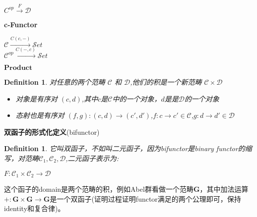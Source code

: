 \documentclass{article}
\newtheorem{definition}[theorem]{Definition}
\begin{document}
\begin{center}
$C^{op} \xrightarrow{F} \mathcal{D}$ \\
\end{center}

\begin{flushleft}
\textbf{c-Functor} \\
\begin{center}
$\mathcal{C} \xrightarrow{C(c,-)} \mathcal{S}et$ \\
$\mathcal{C}^{op} \xrightarrow{C(-,c)} \mathcal{S}et$ \\
\end{center}
\end{flushleft}


\begin{flushleft}
$\textbf{Product}$ \\
\begin{definition}
对任意的两个范畴 $\mathcal{C}$ 和 $\mathcal{D}$,他们的积是一个新范畴 $\mathcal{C} \times \mathcal{D}$\\
\begin{itemize}
	\item 对象是有序对 $\left( c,d \right)$,其中$c$是$\mathcal{C}$中的一个对象，$d$是是$\mathcal{D}$的一个对象 
	\item 态射也是有序对 $\left(f,g \right) \colon \left(c,d\right) \rightarrow \left(c',d'\right)$,$f\colon c \rightarrow c' \in \mathcal{C}$,$g \colon d \rightarrow d' \in \mathcal{D}$
\end{itemize}
\end{definition}
\end{flushleft}


\begin{flushleft}
\textbf{双函子的形式化定义}(bifunctor) \\ 
\begin{definition}
它叫双函子，不如叫二元函子，因为bifunctor是binary functor的缩写，对范畴$\mathcal{C}_1,\mathcal{C}_2,\mathcal{D}$,二元函子表示为:\\

\begin{center}
$F \colon \mathcal{C}_1 \times \mathcal{C}_2 \rightarrow \mathcal{D}$
\end{center}
\end{definition}

这个函子的domain是两个范畴的积，例如Abel群看做一个范畴$\mathbf{G}$，其中加法运算 $+ \colon \mathbf{G} \times \mathbf{G} \rightarrow \mathbf{G}$是一个双函子(证明过程证明functor满足的两个公理即可，保持identity和复合律)。 

\end{flushleft}
\end{document}

